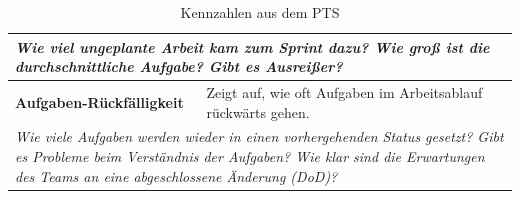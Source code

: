 \begin{table}[H]
\begin{tabular}{p{5cm}p{9.5cm}}
  \multicolumn{2}{p{14.5cm}}{\textit{Wie viel ungeplante Arbeit kam zum Sprint dazu? \newline Wie groß ist die durchschnittliche Aufgabe? Gibt es Ausreißer?}} \\ \midrule
  \textbf{Aufgaben-Rückfälligkeit} & Zeigt auf, wie oft Aufgaben im Arbeitsablauf rückwärts gehen. \\
  \multicolumn{2}{p{14.5cm}}{\textit{Wie viele Aufgaben werden wieder in einen vorhergehenden Status gesetzt? \newline Gibt es Probleme beim Verständnis der Aufgaben? \newline Wie klar sind die Erwartungen des Teams an eine abgeschlossene Änderung (DoD)?}} \\ \bottomrule
  \end{tabular}
  \caption{Kennzahlen aus dem \ac{PTS}}\label{metrics-table-pts}
\end{table}


